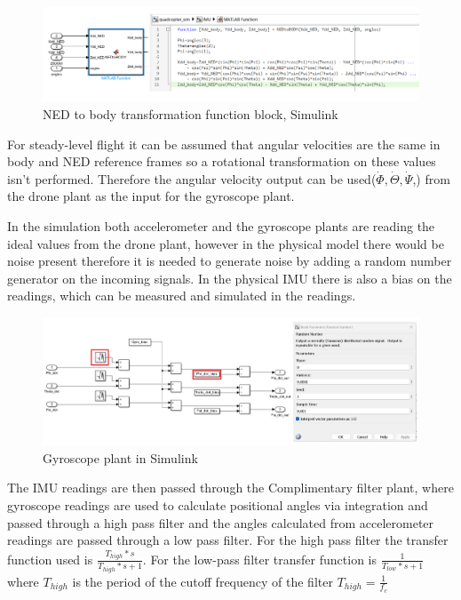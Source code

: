 \begin{figure}[H]
    \begin{center}
    \includegraphics[scale = 0.5]{pictures/IMU/NED_to_bidy_function_block.png}
    \end{center}
    \caption{NED to body transformation function block, Simulink}
    \label{fig:my_label}
\end{figure}

For steady-level flight it can be assumed that angular velocities are the same in body and NED reference frames \cite{AircraftDynamics} so a rotational transformation on these values isn't performed. Therefore the angular velocity output can  be used($\dot{\Phi}, \dot{\Theta}, \dot{\Psi}$,) from the drone plant as the input for the gyroscope plant. 

In the simulation both accelerometer and the gyroscope plants are reading the ideal values from the drone plant, however in the physical model there would be noise present therefore it is needed to generate noise by adding a random number generator on the incoming signals. In the physical IMU there is also a bias on the readings, which can be measured and simulated in the readings.

\begin{figure}[H]
    \begin{center}
    \includegraphics[scale = 0.45]{pictures/IMU/gyro_plant_nr_genrator.png}
    \end{center}
    \caption{Gyroscope plant in Simulink}
    \label{fig:my_label}
\end{figure}

The IMU readings are then passed through the Complimentary filter plant, where gyroscope readings are used to calculate positional angles via integration and passed through a high pass filter and the angles calculated from accelerometer readings are passed through a low pass filter. For the high pass filter the transfer function used is $\frac{T_{high}*s}{T_{high}*s+1}$. For the low-pass filter transfer function is $\frac{1}{T_{low}*s+1}$  where $T_{high}$ is the period of the cutoff frequency of the filter $T_{high}=\frac{1}{f_c}$


